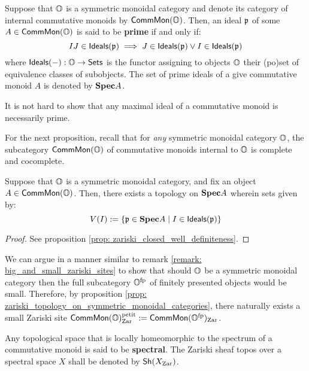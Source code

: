                 \begin{definition} \label{def: prime_ideals_in_symmetric_monoidal_categories}
                    Suppose that $\mathbb{O}$ is a symmetric monoidal category and denote its category of internal commutative monoids by $\mathsf{Comm}\mathsf{Mon}(\mathbb{O})$. Then, an ideal $\mathfrak{p}$ of some $A \in \mathsf{Comm}\mathsf{Mon}(\mathbb{O})$ is said to be \textbf{prime} if and only if:
                        $$IJ \in \mathsf{Ideals}(\mathfrak{p}) \implies J \in \mathsf{Ideals}(\mathfrak{p}) \vee I \in \mathsf{Ideals}(\mathfrak{p})$$
                    where $\mathsf{Ideals}(-): \mathbb{O} \to \mathsf{Sets}$ is the functor assigning to objects $\mathbb{O}$ their (po)set of equivalence classes of subobjects. The set of prime ideals of a give commutative monoid $A$ is denoted by $\mathbf{Spec} A$.
                \end{definition}
                \begin{remark}
                    It is not hard to show that any maximal ideal of a commutative monoid is necessarily prime.
                \end{remark}
                
                For the next proposition, recall that for \textit{any} symmetric monoidal category $\mathbb{O}$, the subcategory $\mathsf{Comm}\mathsf{Mon}(\mathbb{O})$ of commutative monoids internal to $\mathbb{O}$ is complete and cocomplete.
                \begin{proposition} \label{prop: zariski_topology_on_symmetric_monoidal_categories}
                    Suppose that $\mathbb{O}$ is a symmetric monoidal category, and fix an object $A \in \mathsf{Comm}\mathsf{Mon}(\mathbb{O})$. Then, there exists a topology on $\mathbf{Spec} A$ wherein sets given by:
                        $$V(I) := \{\mathfrak{p} \in \mathbf{Spec} A \mid I \in \mathsf{Ideals}(\mathfrak{p})\}$$
                \end{proposition}
                    \begin{proof}
                        See proposition \ref{prop: zariski_closed_well_definiteness}.
                    \end{proof}
                \begin{corollary} \label{coro: small_zariski_sites_in_symmetric_monoidal_categories}
                    We can argue in a manner similar to remark \ref{remark: big_and_small_zariski_sites} to show that should $\mathbb{O}$ be a symmetric monoidal category then the full subcategory $\mathbb{O}^{\mathrm{fp}}$ of finitely presented objects would be small. Therefore, by proposition \ref{prop: zariski_topology_on_symmetric_monoidal_categories}, there naturally exists a small Zariski site $\mathsf{Comm}\mathsf{Mon}(\mathbb{O})_{\mathrm{Zar}}^{\mathrm{petit}} := \mathsf{Comm}\mathsf{Mon}(\mathbb{O}^{\mathrm{fp}})_{\mathrm{Zar}}$. 
                \end{corollary}
                \begin{convention}
                    Any topological space that is locally homeomorphic to the spectrum of a commutative monoid is said to be \textbf{spectral}. The Zariski sheaf topos over a spectral space $X$ shall be denoted by $\mathsf{Sh}(X_{\mathrm{Zar}})$. 
                \end{convention}
                
